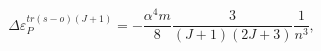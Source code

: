 \begin{equation}
\Delta \varepsilon _{P}^{tr\left( s-o\right) (J+1)}=-\frac{\alpha ^{4}m}{8}%
\frac{3}{\left( J+1\right) \left( 2J+3\right) }\frac{1}{n^{3}},
\end{equation}

